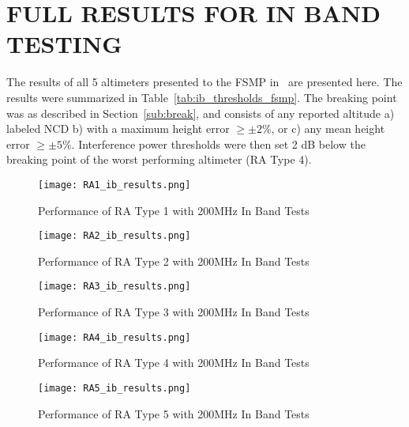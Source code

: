 %
%
%
%



\chapter{\uppercase{Full Results for In Band Testing}}\label{appendix_a}

The results of all 5 altimeters presented to the FSMP in~\cite{uwe_radio_2019} are presented here. The results were summarized in Table~\ref{tab:ib_thresholds_fsmp}. The breaking point was as described in Section~\ref{sub:break}, and consists of any reported altitude a) labeled NCD b) with a maximum height error $\geq\pm2\%$, or c) any mean height error $\geq\pm5\%$. Interference power thresholds were then set 2 dB below the breaking point of the worst performing altimeter (RA Type 4). 
 \begin{figure}[h!]
	\centering
	\texttt{[image: RA1\_ib\_results.png]}
	\caption{Performance of RA Type 1 with 200MHz In Band Tests}
	\label{fig:RA1}
\end{figure}

 \begin{figure}[h!]
	\centering
	\texttt{[image: RA2\_ib\_results.png]}
	\caption{Performance of RA Type 2 with 200MHz In Band Tests}
	\label{fig:RA2}
\end{figure}

 \begin{figure}[h!]
	\centering
	\texttt{[image: RA3\_ib\_results.png]}
	\caption{Performance of RA Type 3 with 200MHz In Band Tests}
	\label{fig:RA3}
\end{figure}

 \begin{figure}[h!]
	\centering
	\texttt{[image: RA4\_ib\_results.png]}
	\caption{Performance of RA Type 4 with 200MHz In Band Tests}
	\label{fig:RA4_appendix}
\end{figure}

 \begin{figure}[h!]
	\centering
	\texttt{[image: RA5\_ib\_results.png]}
	\caption{Performance of RA Type 5 with 200MHz In Band Tests}
	\label{fig:RA5}
\end{figure}
